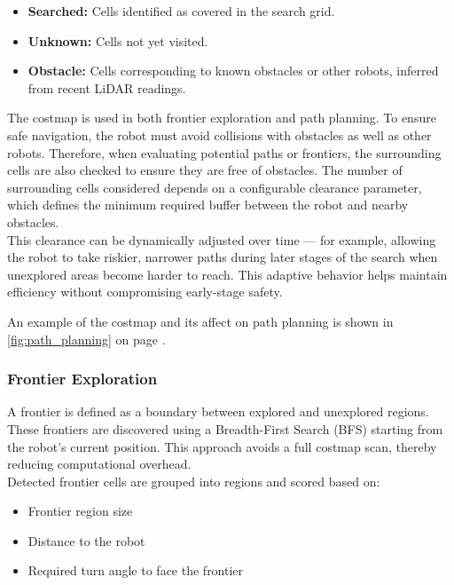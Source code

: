 \begin{itemize}
  \item \textbf{Searched:} Cells identified as covered in the search grid.
  \item \textbf{Unknown:} Cells not yet visited.
  \item \textbf{Obstacle:} Cells corresponding to known obstacles or other robots, inferred from recent LiDAR readings.
\end{itemize}

The costmap is used in both frontier exploration and path planning. To ensure safe navigation, the robot must avoid collisions with obstacles as well as other robots. Therefore, when evaluating potential paths or frontiers, the surrounding cells are also checked to ensure they are free of obstacles. The number of surrounding cells considered depends on a configurable clearance parameter, which defines the minimum required buffer between the robot and nearby obstacles. \\

This clearance can be dynamically adjusted over time --- for example, allowing the robot to take riskier, narrower paths during later stages of the search when unexplored areas become harder to reach. This adaptive behavior helps maintain efficiency without compromising early-stage safety.

An example of the costmap and its affect on path planning is shown in \cref{fig:path_planning} on page \pageref{fig:path_planning}.


\subsubsection{Frontier Exploration}
\label{sec:frontier_exploration}
A frontier is defined as a boundary between explored and unexplored regions. These frontiers are discovered using a Breadth-First Search (BFS) starting from the robot's current position. This approach avoids a full costmap scan, thereby reducing computational overhead. \\

Detected frontier cells are grouped into regions and scored based on:

\begin{itemize}
  \item Frontier region size
  \item Distance to the robot
  \item Required turn angle to face the frontier
\end{itemize}

